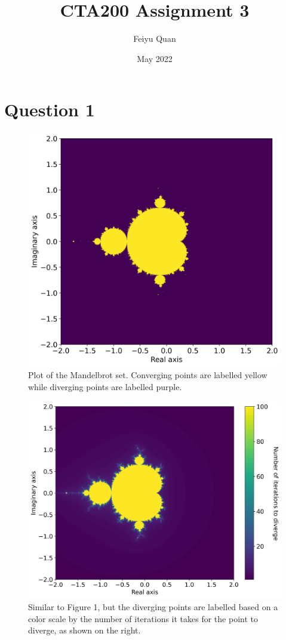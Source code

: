 \documentclass[12pt]{article}
\title{CTA200 Assignment 3}
\author{Feiyu Quan}
\date{May 2022}
\begin{document}
\maketitle

\section{Question 1}

\begin{figure}[H]
    \centering
    \includegraphics[scale = 0.7]{Figure_1.png}
    \caption{Plot of the Mandelbrot set. Converging points are labelled yellow while diverging points are labelled purple.}
\end{figure}

\begin{figure}[H]
    \centering
    \includegraphics[scale = 0.7]{Figure_2.png}
    \caption{Similar to Figure 1, but the diverging points are labelled based on a color scale by the number of iterations it takes for the point to diverge, as shown on the right.}
\end{figure}
\end{document}
